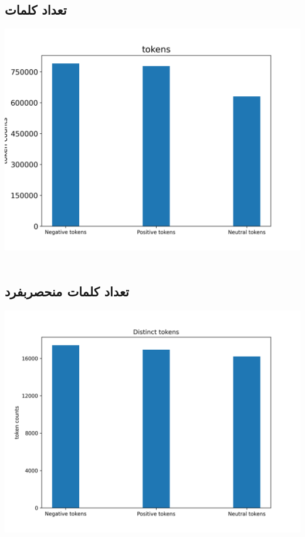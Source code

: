 {	\subsection{تعداد کلمات}
	{
		\begin{center}
			\includegraphics[scale=0.75]{../stats/tokens_for_each_label.png}
		\end{center}
		\begin{align*}
		\end{align*}
	}
	\newpage
	\subsection{تعداد کلمات منحصربفرد}
	{
		\begin{center}
			\includegraphics[scale=0.75]{../stats/distinct_tokens_for_each_label.png}
		\end{center}
		\begin{align*}
		\end{align*}
	}
	\newpage
}

